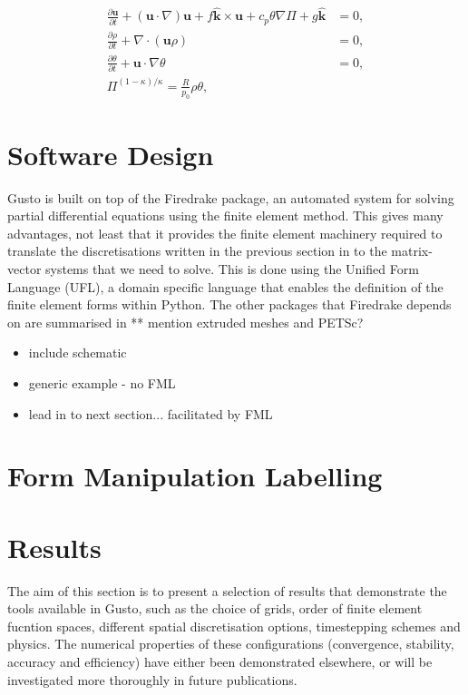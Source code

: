 \documentclass[11pt, a4paper]{article}
\def\MM#1{\boldsymbol{#1}}
\newcommand{\pp}[2]{\frac{\partial #1}{\partial #2}}
\begin{document}
\begin{align}
  \pp{\MM{u}}{t} + 
  (\MM{u}\cdot\nabla)\MM{u} +
  f\hat{\MM{k}}\times \MM{u} + c_p\theta\nabla \Pi + g\hat{\MM{k}} & = 0, \\
  \pp{\rho}{t} + \nabla\cdot(\MM{u}\rho) & = 0, \\
  \pp{\theta}{t} + \MM{u}\cdot\nabla\theta & = 0, \\
  \Pi^{(1-\kappa)/\kappa} = \frac{R}{p_0}\rho\theta, & 
\end{align}

\section{Software Design}
\label{sec: design}
Gusto is built on top of the Firedrake package, an automated system
for solving partial differential equations using the finite element
method. This gives many advantages, not least that it provides the
finite element machinery required to translate the discretisations
written in the previous section in to the matrix-vector systems that
we need to solve. This is done using the Unified Form Language (UFL),
a domain specific language that enables the definition of the finite
element forms within Python. The other packages that Firedrake depends
on are summarised in \citet{davies2022towards} ** mention extruded
meshes and PETSc?



\begin{itemize}
\item include schematic
\item generic example - no FML
\item lead in to next section... facilitated by FML
\end{itemize}

\section{Form Manipulation Labelling}
\label{sec: FML}

\section{Results}
\label{sec: results}
The aim of this section is to present a selection of results that
demonstrate the tools available in Gusto, such as the choice of grids,
order of finite element fucntion spaces, different spatial
discretisation options, timestepping schemes and physics. The
numerical properties of these configurations (convergence, stability,
accuracy and efficiency) have either been demonstrated elsewhere, or
will be investigated more thoroughly in future publications.
\end{document}
